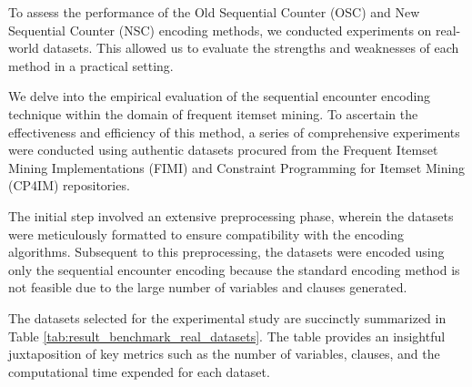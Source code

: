 To assess the performance of the Old Sequential Counter (OSC) and New Sequential Counter (NSC) encoding methods, we conducted experiments on real-world datasets. This allowed us to evaluate the strengths and weaknesses of each method in a practical setting.

We delve into the empirical evaluation of the sequential encounter encoding technique within the domain of frequent itemset mining. To ascertain the effectiveness and efficiency of this method, a series of comprehensive experiments were conducted using authentic datasets procured from the Frequent Itemset Mining Implementations (FIMI) and Constraint Programming\cite{constraint_programming} for Itemset Mining (CP4IM) repositories.

The initial step involved an extensive preprocessing phase,
wherein the datasets were meticulously formatted to ensure compatibility with
the encoding algorithms. Subsequent to this preprocessing,
the datasets were encoded using only the sequential encounter encoding because the standard encoding method is not feasible due to the large number of variables and clauses generated.

The datasets selected for the experimental study are succinctly summarized
in Table \ref{tab:result_benchmark_real_datasets}.
The table provides an insightful juxtaposition of key metrics such as the number of variables,
clauses, and the computational time expended for each dataset.

